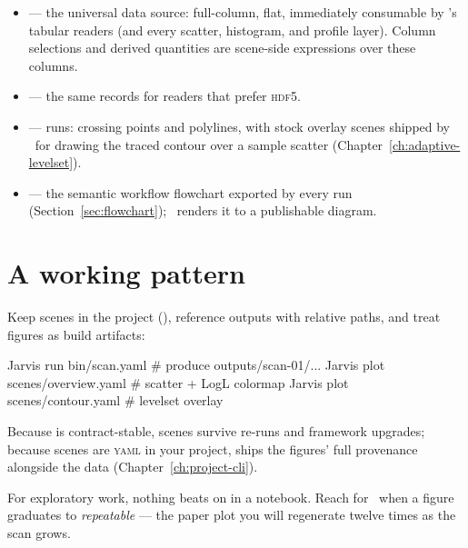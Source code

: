 \begin{itemize}
  \item {} --- the universal data source: full-column,
        flat, immediately consumable by \JPlot's tabular readers (and every scatter,
        histogram, and profile layer). Column selections and derived quantities are
        scene-side expressions over these columns.
  \item {} --- the same records for readers that prefer
        \textsc{hdf5}.
  \item {} ---  runs: crossing points and
        polylines, with stock overlay scenes shipped by \JPlot\ for drawing the traced
        contour over a sample scatter (Chapter~\ref{ch:adaptive-levelset}).
  \item {} --- the semantic workflow flowchart
        exported by every run (Section~\ref{sec:flowchart}); \JPlot\ renders it to a
        publishable diagram.
\end{itemize}

\section{A working pattern}
\label{sec:plot-pattern}

Keep scenes in the project (), reference outputs with relative paths,
and treat figures as build artifacts:

\begin{terminal}
\begin{jcmd}
Jarvis run bin/scan.yaml           # produce outputs/scan-01/...
Jarvis plot scenes/overview.yaml   # scatter + LogL colormap
Jarvis plot scenes/contour.yaml    # levelset overlay
\end{jcmd}
\end{terminal}

Because  is contract-stable, scenes survive re-runs and framework
upgrades; because scenes are \textsc{yaml} in your project, 
ships the figures' full provenance alongside the data
(Chapter~\ref{ch:project-cli}).

\begin{jtip}
For exploratory work, nothing beats  on  in a notebook.
Reach for \JPlot\ when a figure graduates to \emph{repeatable} --- the paper plot you
will regenerate twelve times as the scan grows.
\end{jtip}
